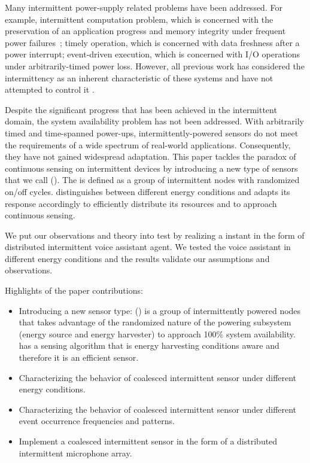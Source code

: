 
Many intermittent power-supply related problems have been addressed. For example, intermittent computation problem, which is concerned with the preservation of an application progress and memory integrity under frequent power failures~\cite{mementos,dino,colin2016chain}; timely operation, which is concerned with data freshness after a power interrupt; event-driven execution, which is concerned with I/O operations under arbitrarily-timed power loss. However, all previous work has considered the intermittency as an inherent characteristic of these systems and have not attempted to control it .  

Despite the significant progress that has been achieved in the intermittent domain, the system availability problem has not been addressed. With arbitrarily timed and time-spanned power-ups, intermittently-powered sensors do not meet the requirements of a wide spectrum of real-world applications. Consequently, they have not gained widespread adaptation. This paper tackles the paradox of continuous sensing on intermittent devices by introducing a new type of sensors that we call \textit{\fullsys} (\sys). The \sys is defined as a group of intermittent nodes with randomized on/off cycles. \sys distinguishes between different energy conditions and adapts its response accordingly to efficiently distribute its resources and to approach continuous sensing.  

We put our observations and theory into test by realizing a \sys instant in the form of distributed intermittent voice assistant agent. We tested the voice assistant in different energy conditions and the results validate our assumptions and observations. 

Highlights of the paper contributions:
\begin{itemize}
		\item Introducing a new sensor type: \textit{\fullsys} (\sys) is a group of intermittently powered nodes that takes advantage of the randomized nature of the powering subsystem (energy source and energy harvester) to approach 100\% system availability. \sys has a sensing algorithm that is energy harvesting conditions aware and therefore it is an efficient sensor. 
		\item Characterizing the behavior of coalesced intermittent sensor under different energy conditions.
		\item Characterizing the behavior of coalesced intermittent sensor under different event occurrence frequencies and patterns. 
		\item Implement a coalesced intermittent sensor in the form of a distributed intermittent microphone array. 
\end{itemize}





